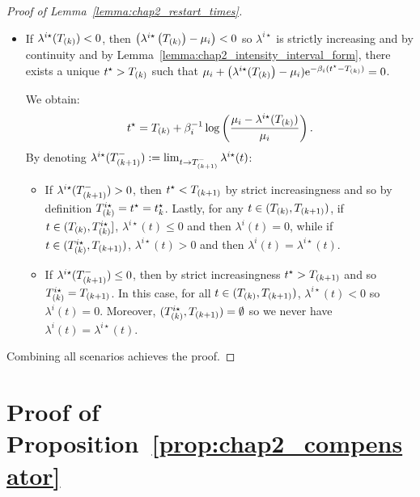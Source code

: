 \begin{subappendices}
\begin{proof}[Proof of Lemma~\ref{lemma:chap2_restart_times}]
\begin{itemize}
            \item If $\lambda^{i\star}(T\park) < 0$, then $\left(\lambda^{i\star}\left(T\park\right) - \mu_i\right) < 0$ so $\lambda^{i\star}$ is strictly increasing and by continuity and by Lemma~\ref{lemma:chap2_intensity_interval_form}, there exists a unique $t^\star > T\park$ such that $\mu_i + \left(\lambda^{i\star}(T\park\right) - \mu_i)\mathrm{e}^{-\beta_i(t^\star-T\park)} = 0$.
  
                We obtain:
                \[t^\star = T\park + \beta_i^{-1}\log{\adaptedpar{\frac{\mu_i - \lambda^{i\star}(T\park)}{\mu_i}}}\,.\] By denoting $\lambda^{i\star}(T\park[k+1]^-) := \lim_{t\to T\park[k+1]^-}{\lambda^{i\star}(t)}$:
  
            \begin{itemize}
                \item If $\lambda^{i\star}(T\park[k+1]^-) > 0$, then $t^\star < T\park[k+1]$ by strict increasingness and so by definition $T^{i\star}\park = t^\star = t^\star_k$.
                Lastly, for any $t\in(T\park, T\park[k+1])$,
                if $t\in(T\park, T^{i\star}\park]$, $\lambda^{i\star}(t) \leq 0$ and then $\lambda^i(t) = 0$,
                while if $t\in(T^{i\star}\park, T\park[k+1])$, $\lambda^{i\star}(t) > 0$ and then $\lambda^i(t) = \lambda^{i\star}(t)$.
                
                \item If $\lambda^{i\star}(T\park[k+1]^-) \leq 0$, then by strict increasingness $t^\star > T\park[k+1]$ and so $T\park^{i\star} = T\park[k+1]$.
                In this case, for all $t\in(T\park, T\park[k+1])$,
                $\lambda^{i\star}(t) < 0$ so $\lambda^i(t)=0$.
                Moreover, $(T^{i\star}\park, T\park[k+1]) = \emptyset$ so we never have $\lambda^i(t) = \lambda^{i\star}(t)$.
            \end{itemize}
  
  
        \end{itemize}
  
        Combining all scenarios achieves the proof.
      \end{proof}
      
  \section{Proof of Proposition~\ref{prop:chap2_compensator}} \label{app:chap2_proof_prop_compensator}
      

\end{subappendices}
